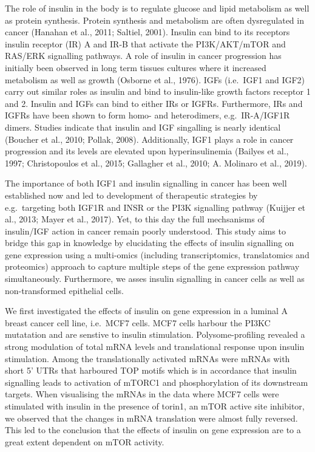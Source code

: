 \documentclass[12pt,openany]{book}
\begin{document}
The role of insulin in the body is to regulate glucose and lipid
metabolism as well as protein synthesis. Protein synthesis and
metabolism are often dysregulated in cancer (Hanahan et al., 2011;
Saltiel, 2001). Insulin can bind to its receptors insulin receptor (IR)
A and IR-B that activate the PI3K/AKT/mTOR and RAS/ERK signalling
pathways. A role of insulin in cancer progression has initially been
observed in long term tissues cultures where it increased metabolism as
well as growth (Osborne et al., 1976). IGFs (i.e.~IGF1 and IGF2) carry
out similar roles as insulin and bind to insulin-like growth factors
receptor 1 and 2. Insulin and IGFs can bind to either IRs or IGFRs.
Furthermore, IRs and IGFRs have been shown to form homo- and
heterodimers, e.g.~IR-A/IGF1R dimers. Studies indicate that insulin and
IGF singalling is nearly identical (Boucher et al., 2010; Pollak, 2008).
Additionally, IGF1 plays a role in cancer progression and its levels are
elevated upon hyperinsulinemia (Bailyes et al., 1997; Christopoulos et
al., 2015; Gallagher et al., 2010; A. Molinaro et al., 2019).

The importance of both IGF1 and insulin signalling in cancer has been
well established now and led to development of therapeutic strategies by
e.g.~targeting both IGF1R and INSR or the PI3K signalling pathway
(Kuijjer et al., 2013; Mayer et al., 2017). Yet, to this day the full
mechsanisms of insulin/IGF action in cancer remain poorly understood.
This study aims to bridge this gap in knowledge by elucidating the
effects of insulin signalling on gene expression using a multi-omics
(including transcriptomics, translatomics and proteomics) approach to
capture multiple steps of the gene expression pathway simultaneously.
Furthermore, we asses insulin signalling in cancer cells as well as
non-transformed epithelial cells.

We first investigated the effects of insulin on gene expression in a
luminal A breast cancer cell line, i.e.~MCF7 cells. MCF7 cells harbour
the PI3KC mutatation and are senstive to insulin stimulation.
Polysome-profiling revealed a strong modulation of total mRNA levels and
translational response upon insulin stimulation. Among the
translationally activated mRNAs were mRNAs with short 5' UTRs that
harboured TOP motifs which is in accordance that insulin signalling
leads to activation of mTORC1 and phosphorylation of its downstream
targets. When visualising the mRNAs in the data where MCF7 cells were
stimulated with insulin in the presence of torin1, an mTOR active site
inhibitor, we observed that the changes in mRNA translation were almost
fully reversed. This led to the conclusion that the effects of insulin
on gene expression are to a great extent dependent on mTOR activity.
\end{document}
